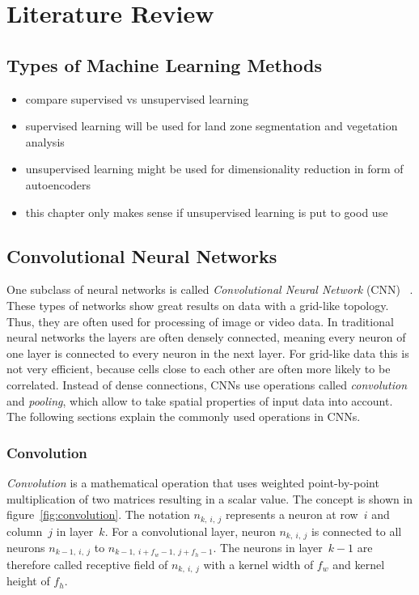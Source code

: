 \section{Literature Review}

\subsection{Types of Machine Learning Methods}
\begin{itemize}
    \item compare supervised vs unsupervised learning
    \item supervised learning will be used for land zone segmentation and vegetation analysis
    \item unsupervised learning might be used for dimensionality reduction in form of autoencoders
    \item this chapter only makes sense if unsupervised learning is put to good use
\end{itemize}

\subsection{Convolutional Neural Networks}
One subclass of neural networks is called \emph{Convolutional Neural Network} (CNN) ~\cite[p.~359]{praxiseinstieg_ml17}. These types of networks show great results on data with a grid-like topology. Thus, they are often used for processing of image or video data. In traditional neural networks the layers are often densely connected, meaning every neuron of one layer is connected to every neuron in the next layer. For grid-like data this is not very efficient, because cells close to each other are often more likely to be correlated. Instead of dense connections, CNNs use operations called \emph{convolution} and \emph{pooling}, which allow to take spatial properties of input data into account. The following sections explain the commonly used operations in CNNs.

\subsubsection{Convolution}
\emph{Convolution} is a mathematical operation that uses weighted point-by-point multiplication of two matrices resulting in a scalar value. The concept is shown in figure~\ref{fig:convolution}. The notation $n_{k,~i,~j}$ represents a neuron at row~$i$ and column~$j$ in layer~$k$. For a convolutional layer, neuron $n_{k,~i,~j}$ is connected to all neurons $n_{k-1,~i,~j}$ to $n_{k-1,~i + f_w -1,~j + f_h -1}$. The neurons in layer~$k-1$ are therefore called receptive field of $n_{k,~i,~j}$ with a kernel width of $f_w$ and kernel height of $f_h$.~\cite[p.~361 f]{praxiseinstieg_ml17}

